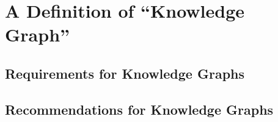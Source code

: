 \section{A Definition of ``Knowledge Graph''}

\subsection{Requirements for Knowledge Graphs}

\subsection{Recommendations for Knowledge Graphs}